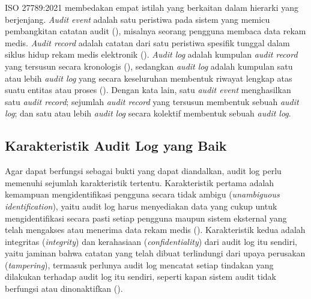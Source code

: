 ISO 27789:2021 membedakan empat istilah yang berkaitan dalam hierarki yang berjenjang. \textit{Audit event} adalah satu peristiwa pada sistem yang memicu pembangkitan catatan audit (\cite{iso27789_2021}), misalnya seorang pengguna membaca data rekam medis. \textit{Audit record} adalah catatan dari satu peristiwa spesifik tunggal dalam siklus hidup rekam medis elektronik (\cite{iso27789_2021}). \textit{Audit log} adalah kumpulan \textit{audit record} yang tersusun secara kronologis (\cite{iso27789_2021}), sedangkan \textit{audit log} adalah kumpulan satu atau lebih \textit{audit log} yang secara keseluruhan membentuk riwayat lengkap atas suatu entitas atau proses (\cite{iso27789_2021}). Dengan kata lain, satu \textit{audit event} menghasilkan satu \textit{audit record}; sejumlah \textit{audit record} yang tersusun membentuk sebuah \textit{audit log}; dan satu atau lebih \textit{audit log} secara kolektif membentuk sebuah \textit{audit log}.

\subsection{Karakteristik Audit Log yang Baik}
\label{subsec:karakteristik-audit-trail}

Agar dapat berfungsi sebagai bukti yang dapat diandalkan, audit log perlu memenuhi sejumlah karakteristik tertentu. Karakteristik pertama adalah kemampuan mengidentifikasi pengguna secara tidak ambigu (\textit{unambiguous identification}), yaitu audit log harus menyediakan data yang cukup untuk mengidentifikasi secara pasti setiap pengguna maupun sistem eksternal yang telah mengakses atau menerima data rekam medis (\cite{iso27789_2021}). Karakteristik kedua adalah integritas (\textit{integrity}) dan kerahasiaan (\textit{confidentiality}) dari audit log itu sendiri, yaitu jaminan bahwa catatan yang telah dibuat terlindungi dari upaya perusakan (\textit{tampering}), termasuk perlunya audit log mencatat setiap tindakan yang dilakukan terhadap audit log itu sendiri, seperti kapan sistem audit tidak berfungsi atau dinonaktifkan (\cite{iso27789_2021}).

